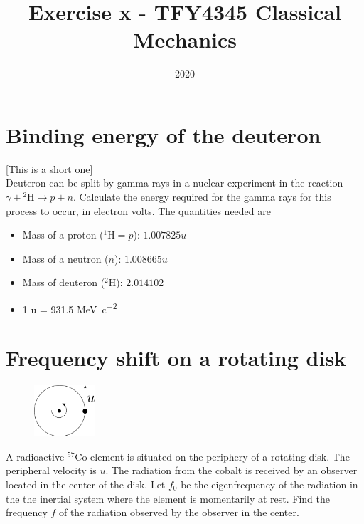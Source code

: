 \documentclass{article}
\title{Exercise x - TFY4345 Classical Mechanics}
\date{2020}
\begin{document}
    \maketitle
    \section{Binding energy of the deuteron}
    [This is a short one] \\
    Deuteron can be split by gamma rays in a nuclear experiment in the reaction $\gamma + {^2\mathrm{H}} \rightarrow p + n$. Calculate the energy required for the gamma rays for this process to occur, in electron volts. The quantities needed are
    \begin{itemize}
        \item Mass of a proton ($^1\mathrm{H} = p$): $1.007825 \si{u}$
        \item Mass of a neutron ($n$): $1.008665 \si{u}$
        \item Mass of deuteron ($^2 \mathrm{H}$): $2.014102$
        \item 1 \si{u} = 931.5 \si{MeV c^{-2}}
    \end{itemize}

    \section{Frequency shift on a rotating disk}
    \begin{figure}
        \vspace{-1cm}
        \includegraphics[width=0.2\textwidth]{figures/figure_1.pdf}
        \vspace{-1cm}
    \end{figure}
    A radioactive $^{57}\mathrm{Co}$ element is situated on the periphery of a rotating disk. The peripheral velocity is $u$. The radiation from the cobalt is received by an observer located in the center of the disk. Let $f_0$ be the eigenfrequency of the radiation in the the inertial system where the element is momentarily at rest. Find the frequency $f$ of the radiation observed by the observer in the center.
    
\end{document}
